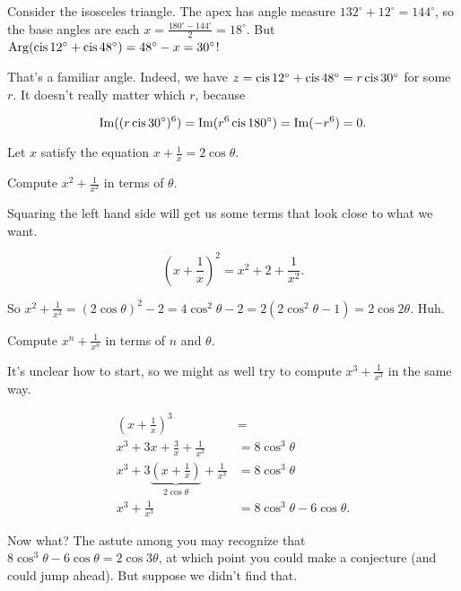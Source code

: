\documentclass[../key.tex]{subfiles}
\newcommand{\cisdeg}[1] {\cis #1^\circ}
\begin{document}
Consider the isosceles triangle. The apex has angle measure $132^\circ + 12^\circ = 144^\circ$, so the base angles are each $x=\frac{180^\circ - 144^\circ}{2} = 18^\circ$. But $\Arg (\cisdeg{12} + \cisdeg{48}) = 48^\circ - x = 30^\circ$!

That's a familiar angle. Indeed, we have $z=\cisdeg{12} + \cisdeg{48}=r\cisdeg{30}$ for some $r$. It doesn't really matter which $r$, because

$$\Imag ((r\cisdeg{30})^6) = \Imag (r^6 \cisdeg{180}) = \Imag(-r^6) = 0.$$

\begin{outer_problem}
\item Let $x$ satisfy the equation $x+\frac{1}{x}=2\cos\theta$.
\end{outer_problem}

\begin{inner_problem}[start=1]
\item Compute $x^2+\frac{1}{x^2}$ in terms of $\theta$.
\end{inner_problem}

Squaring the left hand side will get us some terms that look close to what we want.

$$\left(x + \frac{1}{x}\right)^2 = x^2 + 2 + \frac{1}{x^2}.$$

So $x^2 + \frac{1}{x^2} = (2\cos\theta)^2 - 2 = 4\cos^2\theta - 2 = 2 (2\cos^2\theta - 1) = 2\cos 2\theta$. Huh.

\begin{inner_problem}
\item Compute $x^n+\frac{1}{x^n}$ in terms of $n$ and $\theta$.
\end{inner_problem}

It's unclear how to start, so we might as well try to compute $x^3 + \frac{1}{x^3}$ in the same way.

\begin{align*}
    \left(x + \frac{1}{x}\right)^3 &= \\
    x^3 + 3x + \frac{3}{x} + \frac{1}{x^3} &= 8\cos^3\theta \\
    x^3 + 3\underbrace{\left(x + \frac{1}{x}\right)}_{2\cos \theta} + \frac{1}{x^3} &= 8\cos^3\theta \\
    x^3 + \frac{1}{x^3} &= 8\cos^3\theta - 6\cos\theta.
\end{align*}

Now what? The astute among you may recognize that $8\cos^3\theta - 6\cos\theta = 2\cos 3\theta$, at which point you could make a conjecture (and could jump ahead). But suppose we didn't find that.
\end{document}

